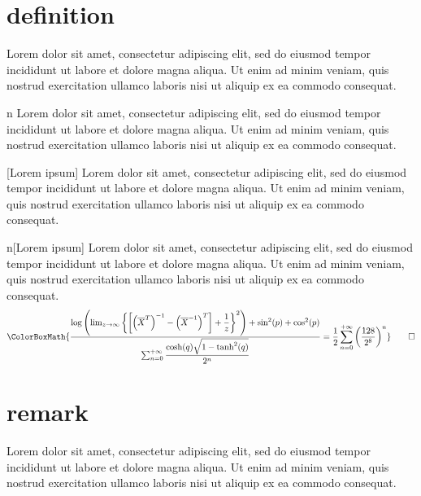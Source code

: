 \newpage

\section{definition}

\begin{definition}{}
	Lorem dolor sit amet, consectetur adipiscing elit, sed do eiusmod tempor incididunt ut labore et dolore magna aliqua. Ut enim ad minim veniam, quis nostrud exercitation ullamco laboris nisi ut aliquip ex ea commodo consequat.
\end{definition}

\begin{definition}{n}
	Lorem dolor sit amet, consectetur adipiscing elit, sed do eiusmod tempor incididunt ut labore et dolore magna aliqua. Ut enim ad minim veniam, quis nostrud exercitation ullamco laboris nisi ut aliquip ex ea commodo consequat.
\end{definition}

\begin{definition}{}[Lorem ipsum]
	Lorem dolor sit amet, consectetur adipiscing elit, sed do eiusmod tempor incididunt ut labore et dolore magna aliqua. Ut enim ad minim veniam, quis nostrud exercitation ullamco laboris nisi ut aliquip ex ea commodo consequat.
\end{definition}

\begin{definition}{n}[Lorem ipsum]
	Lorem dolor sit amet, consectetur adipiscing elit, sed do eiusmod tempor incididunt ut labore et dolore magna aliqua. Ut enim ad minim veniam, quis nostrud exercitation ullamco laboris nisi ut aliquip ex ea commodo consequat.
	\begin{equation*}
		\ColorBoxMath{\dfrac{\log\left(\lim_{z\to\infty}\left\{\left[\left(\overline{X}^{T}\right)^{-1}-\left(\overline{X}^{-1}\right)^T\right]+\dfrac{1}{z}\right\}^2\right)+\sin^2(p)+\cos^2(p)}{\sum_{n=0}^{+\infty}\dfrac{\cosh(q)\sqrt{1-\tanh^2(q)}}{2^n}}=\dfrac{1}{2}\sum_{n=0}^{+\infty}\left(\dfrac{128}{2^8}\right)^n}\qedhere
	\end{equation*}
\end{definition}

\newpage

\section{remark}

\begin{remark}{}
	Lorem dolor sit amet, consectetur adipiscing elit, sed do eiusmod tempor incididunt ut labore et dolore magna aliqua. Ut enim ad minim veniam, quis nostrud exercitation ullamco laboris nisi ut aliquip ex ea commodo consequat.
\end{remark}

